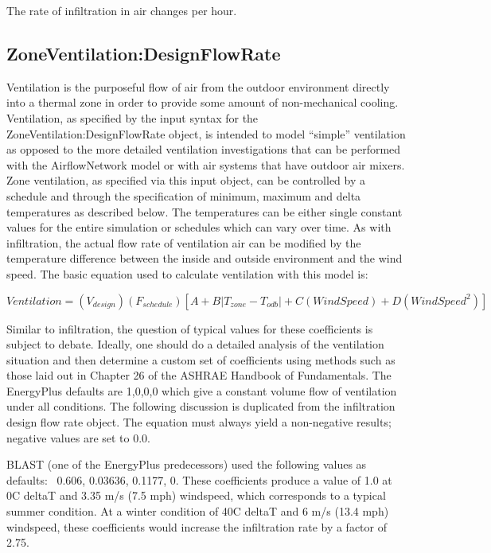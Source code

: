 The rate of infiltration in air changes per hour.

\subsection{ZoneVentilation:DesignFlowRate}\label{zoneventilationdesignflowrate}

Ventilation is the purposeful flow of air from the outdoor environment directly into a thermal zone in order to provide some amount of non-mechanical cooling. Ventilation, as specified by the input syntax for the ZoneVentilation:DesignFlowRate object, is intended to model ``simple'' ventilation as opposed to the more detailed ventilation investigations that can be performed with the AirflowNetwork model or with air systems that have outdoor air mixers. Zone ventilation, as specified via this input object, can be controlled by a schedule and through the specification of minimum, maximum and delta temperatures as described below. The temperatures can be either single constant values for the entire simulation or schedules which can vary over time. As with infiltration, the actual flow rate of ventilation air can be modified by the temperature difference between the inside and outside environment and the wind speed. The basic equation used to calculate ventilation with this model is:

\begin{equation}
Ventilation = \left( {{V_{design}}} \right)\left( {{F_{schedule}}} \right)\left[ {A + B\left| {{T_{zone}} - {T_{odb}}} \right| + C\left( {WindSpeed} \right) + D\left( {WindSpee{d^2}} \right)} \right]
\end{equation}

Similar to infiltration, the question of typical values for these coefficients is subject to debate. Ideally, one should do a detailed analysis of the ventilation situation and then determine a custom set of coefficients using methods such as those laid out in Chapter 26 of the ASHRAE Handbook of Fundamentals. The EnergyPlus defaults are 1,0,0,0 which give a constant volume flow of ventilation under all conditions. The following discussion is duplicated from the infiltration design flow rate object. The equation must always yield a non-negative results; negative values are set to 0.0.

BLAST (one of the EnergyPlus predecessors) used the following values as defaults:~ 0.606, 0.03636, 0.1177, 0. These coefficients produce a value of 1.0 at 0C deltaT and 3.35 m/s (7.5 mph) windspeed, which corresponds to a typical summer condition. At a winter condition of 40C deltaT and 6 m/s (13.4 mph) windspeed, these coefficients would increase the infiltration rate by a factor of 2.75.

